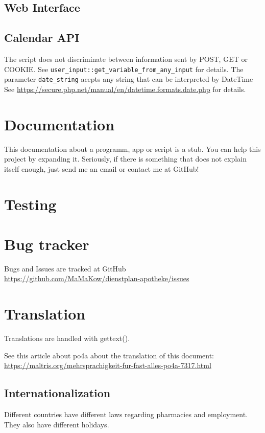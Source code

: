 \subsection{Web Interface}

\subsection{Calendar API}
The script does not discriminate between information sent by POST, GET or COOKIE.
See \lstinline|user_input::get_variable_from_any_input| for details.
The parameter \lstinline|date_string| acepts any string that can be interpreted by DateTime
See \url{https://secure.php.net/manual/en/datetime.formats.date.php} for details.


\section{Documentation}
This documentation about a programm, app or script is a stub. You can help this project by expanding it.
Seriously, if there is something that does not explain itself enough, just send me an email or contact me at GitHub!


\section{Testing}


\section{Bug tracker}
Bugs and Issues are tracked at GitHub \url{https://github.com/MaMaKow/dienstplan-apotheke/issues}


\section{Translation}
Translations are handled with gettext().

See this article about po4a about the translation of this document:
\url{https://maltris.org/mehrsprachigkeit-fur-fast-alles-po4a-7317.html}

\subsection{Internationalization}
Different countries have different laws regarding pharmacies and employment. They also have different holidays.
